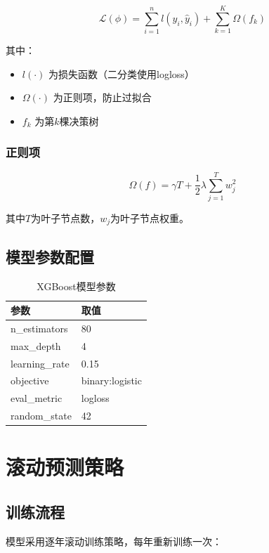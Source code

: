 \documentclass[12pt,a4paper]{article}
\begin{document}
\begin{equation}
\mathcal{L}(\phi) = \sum_{i=1}^{n} l(y_i, \hat{y}_i) + \sum_{k=1}^{K} \Omega(f_k)
\end{equation}

其中：
\begin{itemize}
    \item $l(\cdot)$ 为损失函数（二分类使用logloss）
    \item $\Omega(\cdot)$ 为正则项，防止过拟合
    \item $f_k$ 为第$k$棵决策树
\end{itemize}

\subsubsection{正则项}
\begin{equation}
\Omega(f) = \gamma T + \frac{1}{2}\lambda \sum_{j=1}^{T} w_j^2
\end{equation}

其中$T$为叶子节点数，$w_j$为叶子节点权重。

\subsection{模型参数配置}

\begin{table}[h]
\centering
\caption{XGBoost模型参数}
\begin{tabular}{ll}
\toprule
参数 & 取值 \\
\midrule
n\_estimators & 80 \\
max\_depth & 4 \\
learning\_rate & 0.15 \\
objective & binary:logistic \\
eval\_metric & logloss \\
random\_state & 42 \\
\bottomrule
\end{tabular}
\end{table}

\section{滚动预测策略}

\subsection{训练流程}

模型采用逐年滚动训练策略，每年重新训练一次：
\end{document}
